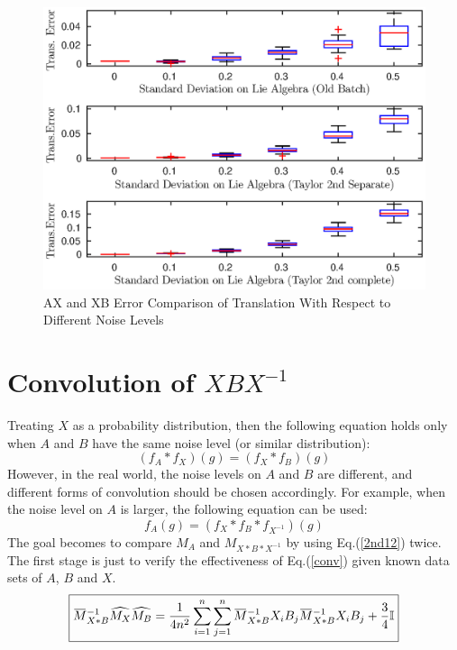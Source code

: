 \documentclass[twocolumn,10pt]{asme2ej}
\newcommand{\II}{\mathbb{I}}
\newcommand{\overbar}[1]{\mkern 1.5mu\overline{\mkern-1.5mu#1\mkern-1.5mu}\mkern 1.5mu}
\begin{document}
\begin{figure}[h]
\includegraphics[scale=0.6]{ax_xb_mean_trans_error_1_6.eps}
\caption{AX and XB Error Comparison of Translation With Respect to Different Noise Levels}
\centering
\end{figure}

\section{Convolution of $XBX^{-1}$}
Treating $X$ as a probability distribution, then the following equation holds only when $A$ and $B$ have the same noise level (or similar distribution):
\begin{equation}
(f_A*f_X)(g) = (f_X*f_B)(g)
\end{equation}
However, in the real world, the noise levels on $A$ and $B$ are different, and different forms of convolution should be chosen accordingly. For example, when the noise level on $A$ is larger, the following equation can be used:
\begin{equation}
f_A(g) = \left(f_X*f_B*f_{X^{-1}}\right)(g)
\label{conv}
\end{equation}
The goal becomes to compare $M_A$ and $M_{X*B*X^{-1}}$ by using Eq.(\ref{2nd12}) twice. The first stage is just to verify the effectiveness of Eq.(\ref{conv}) given known data sets of $A$, $B$ and $X$.
\begin{equation}
\boxed{
\overbar{M}_{X*B}^{-1}\widehat{M_{X}}\widehat{M_{B}} = \dfrac{1}{4n^2} \sum_{i=1}^n \sum_{j=1}^n \overbar{M}_{X*B}^{-1}X_i B_j \overbar{M}_{X*B}^{-1}X_i B_j  + \dfrac{3}{4}\II}
\label{2ndXB}
\end{equation}
\end{document}
